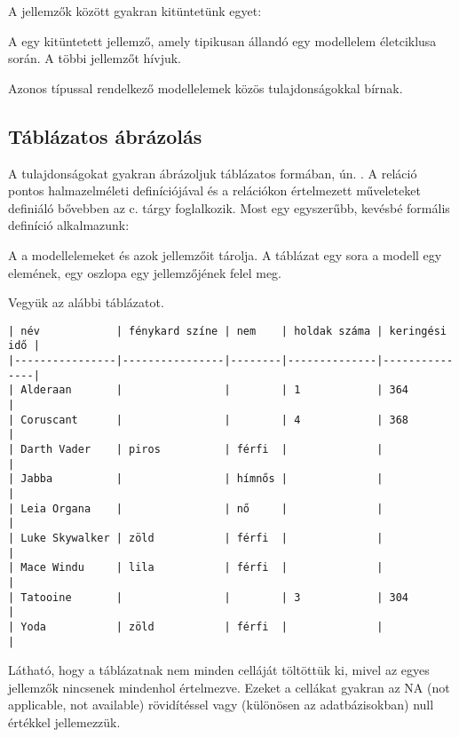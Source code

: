 A jellemzők között gyakran kitüntetünk egyet:

\begin{definicio}
A  egy kitüntetett jellemző, amely tipikusan állandó egy modellelem életciklusa során. A többi jellemzőt  hívjuk.
\end{definicio}

Azonos típussal rendelkező modellelemek közös tulajdonságokkal bírnak.

\subsection{Táblázatos ábrázolás}

A tulajdonságokat gyakran ábrázoljuk táblázatos formában, ún. . A reláció pontos halmazelméleti definíciójával és a relációkon értelmezett műveleteket definiáló  bővebben az \adatb c. tárgy foglalkozik. Most egy egyszerűbb, kevésbé formális definíció alkalmazunk:

\begin{definicio}
A  a modellelemeket és azok jellemzőit tárolja. A táblázat egy sora a modell egy elemének, egy oszlopa egy jellemzőjének felel meg.
\end{definicio}

\begin{pelda}
Vegyük az alábbi táblázatot.
\begin{verbatim}
| név            | fénykard színe | nem    | holdak száma | keringési idő |
|----------------|----------------|--------|--------------|---------------|
| Alderaan       |                |        | 1            | 364           |
| Coruscant      |                |        | 4            | 368           |
| Darth Vader    | piros          | férfi  |              |               |
| Jabba          |                | hímnős |              |               |
| Leia Organa    |                | nő     |              |               |
| Luke Skywalker | zöld           | férfi  |              |               |
| Mace Windu     | lila           | férfi  |              |               |
| Tatooine       |                |        | 3            | 304           |
| Yoda           | zöld           | férfi  |              |               |
\end{verbatim}
\end{pelda}
Látható, hogy a táblázatnak nem minden celláját töltöttük ki, mivel az egyes jellemzők nincsenek mindenhol értelmezve. Ezeket a cellákat gyakran az \textsf{NA} (not applicable, not available) rövidítéssel vagy (különösen az adatbázisokban) \textsf{null} értékkel jellemezzük.

